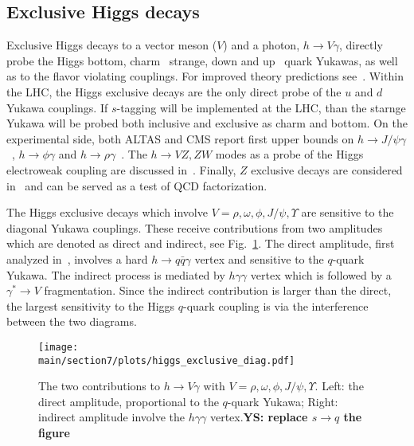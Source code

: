 \documentclass[../report.tex]{subfiles}
\providecommand{\main}{..}
\begin{document}
\subsection{Exclusive Higgs decays}
\label{sec:exclusiveHiggs}

Exclusive Higgs decays to a vector meson ($V$) and a photon, $h\to V\gamma$, directly probe the Higgs bottom, charm~\cite{Bodwin:2013gca,Bodwin:2014bpa} strange, down and up~\cite{Kagan:2014ila} quark Yukawas, as well as to the flavor violating couplings. 
For improved theory predictions see~\cite{Koenig:2015pha}.
Within the LHC, the Higgs exclusive decays are the only direct probe of the $u$ and $d$ Yukawa couplings. If $s$-tagging will be implemented at the LHC, than the starnge Yukawa will be probed both inclusive and exclusive as charm and bottom.  
On the experimental side, both ALTAS and CMS report first upper bounds on $h\to J/\psi\gamma$~\cite{Aad:2015sda,Khachatryan:2015lga}, $h\to\phi\gamma$ and $h\to\rho\gamma$~\cite{Aaboud:2016rug,Aaboud:2017xnb}. 
The $h \to VZ, ZW$ modes as a probe of the Higgs electroweak coupling are discussed  in~\cite{Isidori:2013cla}. 
Finally, $Z$ exclusive decays are considered in~\cite{Grossmann:2015lea,Alte:2015dpo} and can be served as a test of QCD factorization. 

The Higgs exclusive decays which involve $V=\rho,\omega,\phi,J/\psi,\Upsilon$ are sensitive to the diagonal Yukawa couplings. 
These receive contributions from two amplitudes which are denoted as direct and indirect, see Fig.~\ref{fig:hexlusive}. 
The direct amplitude, first analyzed in~\cite{Keung:1983ac}, involves a hard $h\to q\bar{q}\gamma$ vertex and sensitive to the $q$-quark Yukawa. 
The indirect process is mediated by $h\gamma\gamma$ vertex which is followed by a $\gamma^*\to V$ fragmentation. 
Since the indirect contribution is larger than the direct, the largest sensitivity to the Higgs $q$-quark coupling is via the interference between the two diagrams. 
\begin{figure}[t]
\begin{center}
\texttt{[image: \\main/section7/plots/higgs\_exclusive\_diag.pdf]}
\caption{The two contributions to $h \to V\gamma$ with $V=\rho,\omega,\phi,J/\psi,\Upsilon$. Left: the direct amplitude, proportional to  the $q$-quark Yukawa; Right: indirect amplitude involve the $h\gamma\gamma$ vertex.{\bf YS: replace $s\to q$ the figure}}
\label{fig:hexlusive}
\end{center}
\end{figure}
\end{document}
